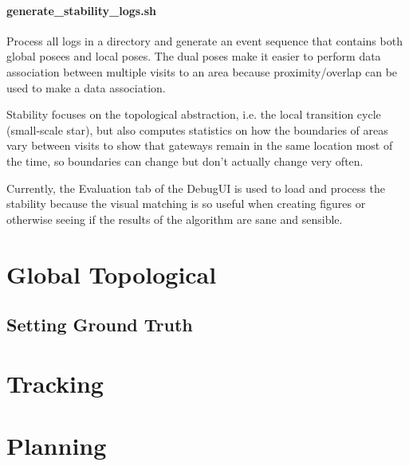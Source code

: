 \documentclass{article}
\begin{document}
\paragraph{generate\_stability\_logs.sh}

Process all logs in a directory and generate an event sequence that contains both global posees and local poses. The 
dual poses make it easier to perform data association between multiple visits to an area because proximity/overlap
can be used to make a data association.

Stability focuses on the topological abstraction, i.e. the local transition cycle (small-scale star), but also
computes statistics on how the boundaries of areas vary between visits to show that gateways remain in the same
location most of the time, so boundaries can change but don't actually change very often.

Currently, the Evaluation tab of the DebugUI is used to load and process the stability because the visual matching
is so useful when creating figures or otherwise seeing if the results of the algorithm are sane and sensible.

\section{Global Topological}

\subsection{Setting Ground Truth}

\section{Tracking}

\section{Planning}

 
\end{document}

